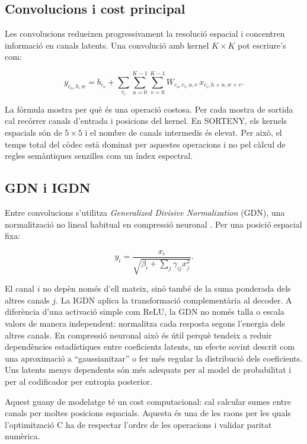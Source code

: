 \subsection{Convolucions i cost principal}

Les convolucions redueixen progressivament la resolució espacial i concentren
informació en canals latents. Una convolució amb kernel $K\times K$ pot
escriure's com:

\begin{equation}
y_{c_o,h,w}=b_{c_o}+
\sum_{c_i}\sum_{u=0}^{K-1}\sum_{v=0}^{K-1}
W_{c_o,c_i,u,v}\,x_{c_i,h+u,w+v}.
\label{eq:conv2d}
\end{equation}

La fórmula mostra per què és una operació costosa. Per cada mostra de sortida
cal recórrer canals d'entrada i posicions del kernel. En SORTENY, els kernels
espacials són de $5\times5$ i el nombre de canals intermedis és elevat. Per
això, el temps total del còdec està dominat per aquestes operacions i no pel
càlcul de regles semàntiques senzilles com un índex espectral.

\subsection{GDN i IGDN}

Entre convolucions s'utilitza \emph{Generalized Divisive Normalization} (GDN),
una normalització no lineal habitual en compressió neuronal
\cite{balle2017end}. Per una posició espacial fixa:

\begin{equation}
y_i=\frac{x_i}
{\sqrt{\beta_i+\sum_j\gamma_{ij}x_j^2}}.
\label{eq:gdn}
\end{equation}

El canal $i$ no depèn només d'ell mateix, sinó també de la suma ponderada dels
altres canals $j$. La IGDN aplica la transformació complementària al decoder.
A diferència d'una activació simple com ReLU, la GDN no només talla o escala
valors de manera independent: normalitza cada resposta segons l'energia dels
altres canals. En compressió neuronal això és útil perquè tendeix a reduir
dependències estadístiques entre coeficients latents, un efecte sovint descrit
com una aproximació a ``gaussianitzar'' o fer més regular la distribució dels
coeficients. Uns latents menys dependents són més adequats per al model de
probabilitat i per al codificador per entropia posterior.

Aquest guany de modelatge té un cost computacional: cal calcular sumes entre
canals per moltes posicions espacials. Aquesta és una de les raons per les quals
l'optimització C ha de respectar l'ordre de les operacions i validar paritat
numèrica.

